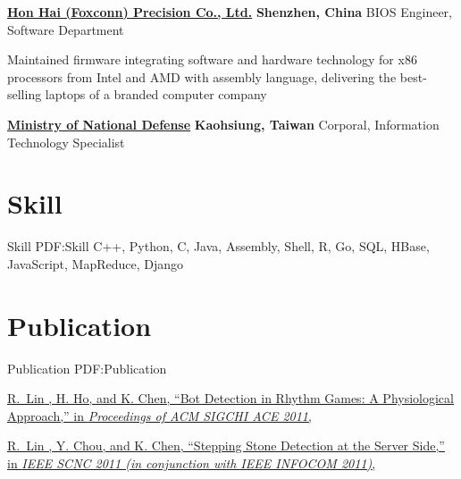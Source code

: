 \documentclass[a4paper,10pt,oneside]{article}
\newcommand{\CVNote}{CV compiled on {\today}}
\begin{document}
\begin{body}
\SmallEntryGap
\href{http://www.foxconn.com.tw/}
{\textbf{Hon Hai (Foxconn) Precision Co., Ltd.}}
\hfill
\textbf{Shenzhen, China}
BIOS Engineer, Software Department
\begin{detail}
\BulletItem
Maintained firmware integrating software and hardware technology for x86 processors from Intel and AMD with assembly language, delivering the best-selling laptops of a branded computer company 
\end{detail}

\SmallEntryGap
\href{http://www.mnd.gov.tw/english/}
{\textbf{Ministry of National Defense}}
\hfill
\textbf{Kaohsiung, Taiwan}
Corporal, Information Technology Specialist


\section{Skill}
{Skill}
{PDF:Skill}
C++, Python, C, Java, Assembly, Shell, R, Go, SQL, HBase, JavaScript, MapReduce, Django
\section{Publication}
{Publication}
{PDF:Publication}

\href{http://mmnet.iis.sinica.edu.tw/publication_detail.html?key=lin11_rhythm_bots}
{
\underline{R.~Lin} , H. Ho, and K. Chen,
``Bot Detection in Rhythm Games: A Physiological Approach,''
in \textit{Proceedings of ACM SIGCHI ACE 2011},
}

\href{http://mmnet.iis.sinica.edu.tw/publication_detail.html?key=lin11_stepping_stone}
{
\underline{R.~Lin} , Y. Chou, and K. Chen,
``Stepping Stone Detection at the Server Side,''
in \textit{IEEE SCNC 2011 (in conjunction with IEEE INFOCOM 2011)},
}







\end{body}



\end{document}
